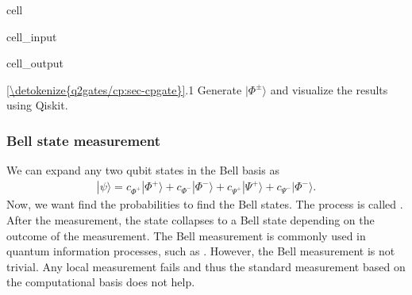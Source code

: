 \documentclass[letterpaper,10pt,english]{jupyterBook}
\begin{document}
\begin{sphinxuseclass}{cell}\begin{sphinxVerbatimInput}

\begin{sphinxuseclass}{cell_input}
\begin{sphinxVerbatim}[commandchars=\\\{\}]
   
\end{sphinxVerbatim}

\end{sphinxuseclass}\end{sphinxVerbatimInput}
\begin{sphinxVerbatimOutput}

\begin{sphinxuseclass}{cell_output}
\noindent{}

\end{sphinxuseclass}\end{sphinxVerbatimOutput}

\end{sphinxuseclass}
\sphinxAtStartPar
{}  \hyperref[\detokenize{q2gates/cp:sec-cpgate}]{\ref{\detokenize{q2gates/cp:sec-cpgate}}}.1  Generate \(|\Phi^{\pm}\rangle\) and visualize the results using Qiskit.


\subsubsection{Bell state measurement}
\label{\detokenize{q2gates/cx:bell-state-measurement}}\label{\detokenize{q2gates/cx:ssec-bell-measurement}}
\sphinxAtStartPar
We can expand any two qubit states in the Bell basis as
\begin{equation}\label{equation:q2gates/cx:bell-expansion}
\begin{split}
|\psi\rangle = c_{\Phi^+} |\Phi^{+}\rangle + c_{\Phi^-} |\Phi^{-}\rangle + c_{\Psi^+} |\Psi^{+}\rangle + c_{\Psi^-} |\Phi^{-}\rangle .
\end{split}
\end{equation}
\sphinxAtStartPar
Now, we want find the probabilities to find the Bell states. The process is called .  After the measurement, the state collapses to a Bell state depending on the outcome of the measurement.  The Bell measurement is commonly used in quantum information processes, such as .  However, the Bell measurement is not trivial.  Any local measurement fails and thus the standard measurement based on the computational basis does not help.
\end{document}
